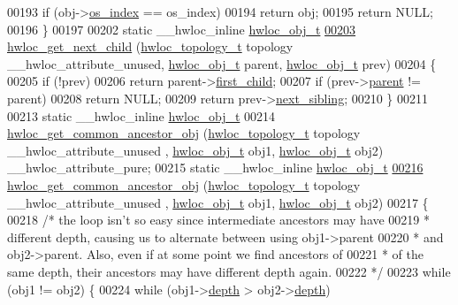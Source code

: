 \begin{DoxyCode}
{{00193     \textcolor{keywordflow}{if} (obj->\hyperlink{a00016_a61a7a80a68eaccbaaa28269e678c81a9}{os_index} == os\_index)
00194       \textcolor{keywordflow}{return} obj;
00195   \textcolor{keywordflow}{return} NULL;
00196 \}
00197 
00202 \textcolor{keyword}{static} \_\_hwloc\_inline \hyperlink{a00016}{hwloc_obj_t}
\hypertarget{a00031_source_l00203}{}\hyperlink{a00053_gae5ef1af636849f77714e1584ba78cf9c}{00203} \hyperlink{a00053_gae5ef1af636849f77714e1584ba78cf9c}{hwloc_get_next_child} (\hyperlink{a00039_ga9d1e76ee15a7dee158b786c30b6a6e38}{hwloc_topology_t} topology \_\_hwloc\_attribute\_unused, 
      \hyperlink{a00016}{hwloc_obj_t} parent, \hyperlink{a00016}{hwloc_obj_t} prev)
00204 \{
00205   \textcolor{keywordflow}{if} (!prev)
00206     \textcolor{keywordflow}{return} parent->\hyperlink{a00016_af51d08a0a79dba517c06c5afedc8d2dc}{first_child};
00207   \textcolor{keywordflow}{if} (prev->\hyperlink{a00016_adc494f6aed939992be1c55cca5822900}{parent} != parent)
00208     \textcolor{keywordflow}{return} NULL;
00209   \textcolor{keywordflow}{return} prev->\hyperlink{a00016_a7f2343ed476fe4942e6fffd4cade1b40}{next_sibling};
00210 \}
00211 
00213 \textcolor{keyword}{static} \_\_hwloc\_inline \hyperlink{a00016}{hwloc_obj_t}
00214 \hyperlink{a00053_ga52a334f17c6b5b409d5cc6bb4ab8a2ab}{hwloc_get_common_ancestor_obj} (\hyperlink{a00039_ga9d1e76ee15a7dee158b786c30b6a6e38}{hwloc_topology_t} topology \_\_hwloc\_attribute\_unused
      , \hyperlink{a00016}{hwloc_obj_t} obj1, \hyperlink{a00016}{hwloc_obj_t} obj2) \_\_hwloc\_attribute\_pure;
00215 \textcolor{keyword}{static} \_\_hwloc\_inline \hyperlink{a00016}{hwloc_obj_t}
\hypertarget{a00031_source_l00216}{}\hyperlink{a00053_ga52a334f17c6b5b409d5cc6bb4ab8a2ab}{00216} \hyperlink{a00053_ga52a334f17c6b5b409d5cc6bb4ab8a2ab}{hwloc_get_common_ancestor_obj} (\hyperlink{a00039_ga9d1e76ee15a7dee158b786c30b6a6e38}{hwloc_topology_t} topology \_\_hwloc\_attribute\_unused
      , \hyperlink{a00016}{hwloc_obj_t} obj1, \hyperlink{a00016}{hwloc_obj_t} obj2)
00217 \{
00218   \textcolor{comment}{/* the loop isn't so easy since intermediate ancestors may have}
00219 \textcolor{comment}{   * different depth, causing us to alternate between using obj1->parent}
00220 \textcolor{comment}{   * and obj2->parent. Also, even if at some point we find ancestors of}
00221 \textcolor{comment}{   * of the same depth, their ancestors may have different depth again.}
00222 \textcolor{comment}{   */}
00223   \textcolor{keywordflow}{while} (obj1 != obj2) \{
00224     \textcolor{keywordflow}{while} (obj1->\hyperlink{a00016_a9d82690370275d42d652eccdea5d3ee5}{depth} > obj2->\hyperlink{a00016_a9d82690370275d42d652eccdea5d3ee5}{depth})
}}
\end{DoxyCode}
